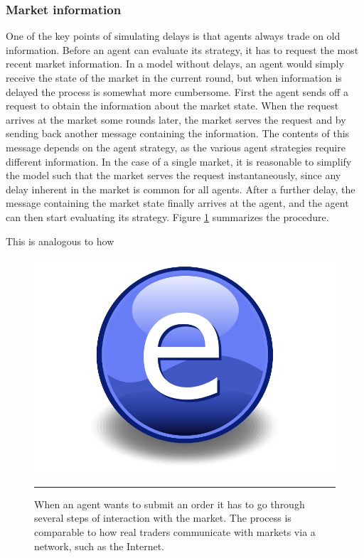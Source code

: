 \subsubsection{Market information}
One of the key points of simulating delays is that agents always trade on old information. Before an agent can evaluate its strategy, it has to request the most recent market information. In a model without delays, an agent would simply receive the state of the market in the current round, but when information is delayed the process is somewhat more cumbersome. First the agent sends off a request to obtain the information about the market state. When the request arrives at the market some rounds later, the market serves the request and by sending back another message containing the information. The contents of this message depends on the agent strategy, as the various agent strategies require different information. 
In the case of a single market, it is reasonable to simplify the model such that the market serves the request instantaneously, since any delay inherent in the market is common for all agents. 
After a further delay, the message containing the market state finally arrives at the agent, and the agent can then start evaluating its strategy. Figure \ref{fig:information_exchange} summarizes the procedure.

This is analogous to how 
\begin{figure}[htbp]
	\centering
		\includegraphics{Figures/Electron.pdf}
		\rule{35em}{0.5pt}
	\caption{When an agent wants to submit an order it has to go through several steps of interaction with the market. The process is comparable to how real traders communicate with markets via a network, such as the Internet.}
	\label{fig:information_exchange}
\end{figure}

